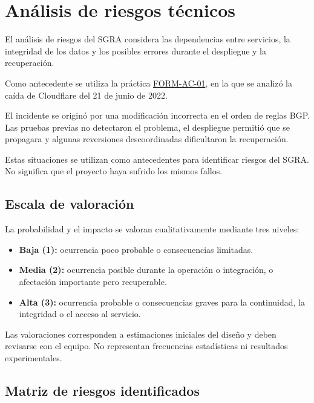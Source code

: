 \section{Análisis de riesgos técnicos}

El análisis de riesgos del SGRA considera las dependencias entre servicios, la integridad de los datos y los posibles errores durante el despliegue y la recuperación.

Como antecedente se utiliza la práctica \href{https://github.com/Yukisan-uwo/FORM-AC-01-Analisis-de-Caso-Fallo-en-Sistema-Distribuido-Real} {FORM-AC-01}, en la que se analizó la caída de Cloudflare del 21 de junio de 2022.

El incidente se originó por una modificación incorrecta en el orden de reglas BGP. Las pruebas previas no detectaron el problema, el despliegue permitió que se propagara y algunas reversiones descoordinadas dificultaron la recuperación.

Estas situaciones se utilizan como antecedentes para identificar riesgos del SGRA. No significa que el proyecto haya sufrido los mismos fallos.

\subsection{Escala de valoración}

La probabilidad y el impacto se valoran cualitativamente mediante tres niveles:

\begin{itemize}
    \item \textbf{Baja (1):} ocurrencia poco probable
    o consecuencias limitadas.
    \item \textbf{Media (2):} ocurrencia posible
    durante la operación o integración, o
    afectación importante pero recuperable.
    \item \textbf{Alta (3):} ocurrencia probable
    o consecuencias graves para la continuidad,
    la integridad o el acceso al servicio.
\end{itemize}

Las valoraciones corresponden a estimaciones iniciales del diseño y deben revisarse con el equipo. No representan frecuencias estadísticas ni resultados experimentales.

\subsection{Matriz de riesgos identificados}

